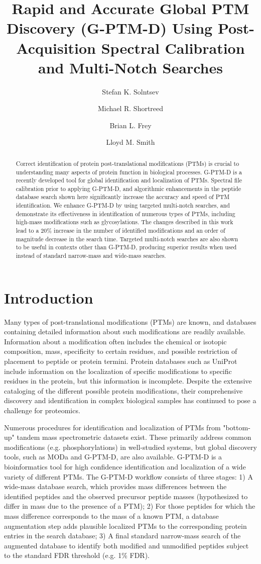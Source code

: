 \documentclass[journal=jprobs,manuscript=article]{achemso}
\author{Stefan K. Solntsev}
\author{Michael R. Shortreed}
\author{Brian L. Frey}
\author{Lloyd M. Smith}
\affiliation[UwMadison]
{University of Wisconsin-Madison}
\title[Rapid and Accurate Global PTM Discovery (G-PTM-D) Using Post-Acquisition Spectral Calibration and Multi-Notch Searches]
  {Rapid and Accurate Global PTM Discovery (G-PTM-D) Using Post-Acquisition Spectral Calibration and Multi-Notch Searches}
\begin{document}
\begin{abstract}

Correct identification of protein post-translational modifications (PTMs) is crucial to understanding many aspects of protein function in biological processes.
G-PTM-D\citep{Li_2016} is a recently developed tool for global identification and localization of PTMs.
Spectral file calibration prior to applying G-PTM-D, and algorithmic enhancements in the peptide database search shown here significantly increase the accuracy and speed of PTM identification.
We enhance G-PTM-D by using targeted multi-notch searches, and demonstrate its effectiveness in identification of numerous types of PTMs, including high-mass modifications such as glycosylations.
The changes described in this work lead to a 20\% increase in the number of identified modifications and an order of magnitude decrease in the search time.
Targeted multi-notch searches are also shown to be useful in contexts other than G-PTM-D, producing superior results when used instead of standard narrow-mass and wide-mass searches.
\end{abstract}

\section{Introduction}

Many types of post-translational modifications (PTMs) are known, and databases containing detailed information about such modifications are readily available\citep{Creasy_2004}.
Information about a modification often includes the chemical or isotopic composition, mass, specificity to certain residues, and possible restriction of placement to peptide or protein termini.
Protein databases such as UniProt\citep{Uniprot_2017} include information on the localization of specific modifications to specific residues in the protein, but this information is incomplete.
Despite the extensive cataloging of the different possible protein modifications, their comprehensive discovery and identification in complex biological samples has continued to pose a challenge for proteomics\citep{Olsen_2013}.

Numerous procedures for identification and localization of PTMs from "bottom-up" tandem mass spectrometric datasets exist.
These primarily address common modifications (e.g. phosphorylations) in well-studied systems, but global discovery tools, such as MODa\citep{Na_2011} and G-PTM-D\citep{Li_2016}, are also available.
G-PTM-D is a bioinformatics tool for high confidence identification and localization of a wide variety of different PTMs.
The G-PTM-D workflow consists of three stages: 1) A wide-mass database search\citep{Chick_2015, Na_2011}, which provides mass differences between the identified peptides and the observed precursor peptide masses (hypothesized to differ in mass due to the presence of a PTM);
2) For those peptides for which the mass difference corresponds to the mass of a known PTM, a database augmentation step adds plausible localized PTMs to the corresponding protein entries in the search database;
3) A final standard narrow-mass search of the augmented database to identify both modified and unmodified peptides subject to the standard FDR threshold (e.g. 1\% FDR).
\end{document}
